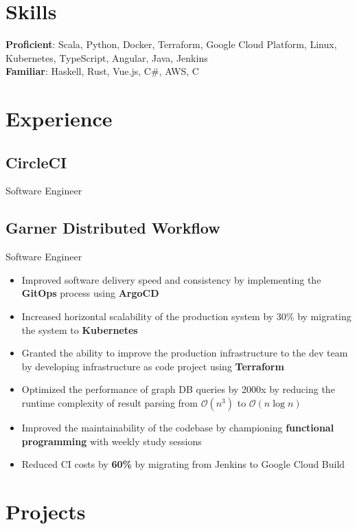 \documentclass[letterpaper,12pt,oneside]{article}
\begin{document}
\section*{Skills}
\textbf{Proficient}:
Scala, Python, Docker, Terraform, Google Cloud Platform, Linux,
Kubernetes, TypeScript, Angular, Java, Jenkins \\
\textbf{Familiar}:
Haskell, Rust, Vue.js, C\#, AWS, C

\section*{Experience}
\subsection*{CircleCI \hfill {}}
Software Engineer

\subsection*{Garner Distributed Workflow \hfill {}}
Software Engineer
\begin{itemize}
    \setlength\itemsep{0em}
    \item Improved software delivery speed and consistency by implementing the \textbf{GitOps} process using \textbf{ArgoCD}
    \item Increased horizontal scalability of the production system by 30\% by migrating the system to \textbf{Kubernetes}
    \item Granted the ability to improve the production infrastructure to the dev team by developing infrastructure as code project using \textbf{Terraform}
    \item Optimized the performance of graph DB queries by 2000x by reducing the runtime complexity of result parsing from $\mathcal{O}(n^3)$ to $\mathcal{O}(n\log{}n)$
    \item Improved the maintainability of the codebase by championing \textbf{functional programming} with weekly study sessions
    \item Reduced CI costs by \textbf{60\%} by migrating from Jenkins to Google Cloud Build
\end{itemize}

\section*{Projects}
\end{document}

